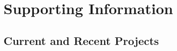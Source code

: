\documentclass[12pt]{article}
\begin{document}

\newpage


\newpage

\section*{Supporting Information}

\subsection{Current and Recent Projects}











\newpage


\end{document}
